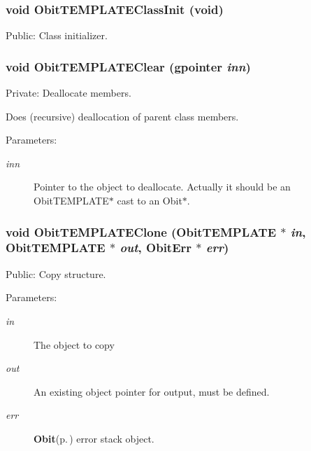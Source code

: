 \subsubsection{\setlength{\rightskip}{0pt plus 5cm}void Obit\-TEMPLATEClass\-Init (void)}\label{ObitTEMPLATE_8c_a11}


Public: Class initializer. 

\subsubsection{\setlength{\rightskip}{0pt plus 5cm}void Obit\-TEMPLATEClear (gpointer {\em inn})}\label{ObitTEMPLATE_8c_a4}


Private: Deallocate members. 

Does (recursive) deallocation of parent class members. \begin{Desc}
\item[Parameters:]
\begin{description}
\item[{\em inn}]Pointer to the object to deallocate. Actually it should be an Obit\-TEMPLATE$\ast$ cast to an Obit$\ast$. \end{description}
\end{Desc}
\subsubsection{\setlength{\rightskip}{0pt plus 5cm}void Obit\-TEMPLATEClone ({\bf Obit\-TEMPLATE} $\ast$ {\em in}, {\bf Obit\-TEMPLATE} $\ast$ {\em out}, {\bf Obit\-Err} $\ast$ {\em err})}\label{ObitTEMPLATE_8c_a9}


Public: Copy structure. 

\begin{Desc}
\item[Parameters:]
\begin{description}
\item[{\em in}]The object to copy \item[{\em out}]An existing object pointer for output, must be defined. \item[{\em err}]{\bf Obit}{\rm (p.\,\pageref{structObit})} error stack object. \end{description}
\end{Desc}
